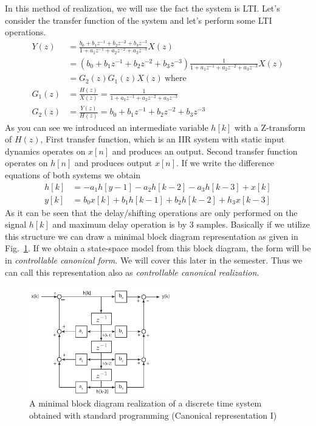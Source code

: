 \documentclass[twoside]{article}
\begin{document}
In this method of realization, we will use the fact the system is
LTI. Let's consider the transfer function of the system and let's 
perform some LTI operations.
%
\begin{align*}
Y(z) &= \frac{b_0 + b_1 z^{-1} + b_2 z^{-2} + b_3 z^{-3}}{1+ a_1
       z^{-1} + a_2 z^{-2} + a_3 z^{-3}} X(z)
\\
&= \left( b_0 + b_1 z^{-1} + b_2 z^{-2} + b_3 z^{-3} \right) \frac{1}{1+ a_1
       z^{-1} + a_2 z^{-2} + a_3 z^{-3}} X(z) 
\\
&= G_2(z) G_1(z) X(z) \ \mathrm{where} 
\\
G_1(z) &= \frac{H(z)}{X(z)} = \frac{1}{1+ a_1
       z^{-1} + a_2 z^{-2} + a_3 z^{-3}} 
\\
G_2(z) &= \frac{Y(z)}{H(z)} = b_0 + b_1 z^{-1} + b_2 z^{-2} + b_3 z^{-3} 
\end{align*}
%
As you can see we introduced an intermediate variable $h[k]$ with a
Z-transform of $H(z)$, First transfer function, which is an IIR system
with static input dynamics operates on $x[n]$ and produces an output. 
Second transfer function operates on $h[n]$ and produces output
$x[n]$. If we write the difference equations of both systems we obtain
%
\begin{align*}
h[k] &= -a_1 h[y-1] - a_2 h[k-2] - a_3 h[k-3] + x[k] 
\\
y[k] &= b_0 x[k] + b_1 h[k-1] + b_2 h[k-2] + h_3 x[k-3] 
\end{align*}
%
As it can be seen that the delay/shifting operations are only
performed on the signal $h[k]$ and maximum delay operation 
is by 3 samples. Basically if we utilize this structure we can draw a
minimal block diagram representation as given in
Fig.~\ref{fig:standard}. If we obtain a state-space model from this block diagram, the form
will be in \textit{controllable canonical form}. We will cover this
later in the semester. Thus we can call this representation also as 
\textit{controllable canonical realization}. 
%
\begin{figure}[h]
    \centering
      \includegraphics[width=0.55\textwidth]{standard}
    \caption{A minimal block diagram realization of a discrete time
      system obtained with standard programming (Canonical
      representation I)}
        \label{fig:standard}
\end{figure}
\end{document}
